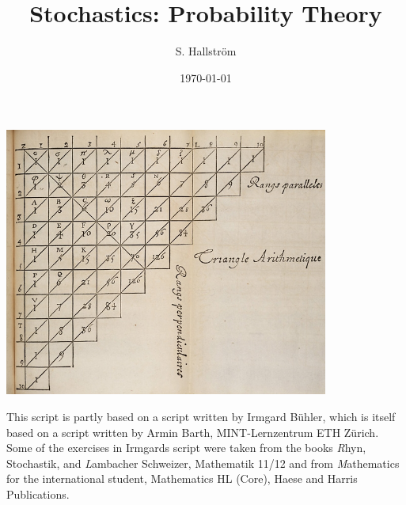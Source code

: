 \documentclass[twoside,11pt,a4paper]{article}
\newif\ifEN \ENtrue	                %
\def\tr|#1|#2|{\ifEN #2\else #1\fi}     %
\renewcommand{\footrulewidth}{0pt}
\theoremstyle{definition}
\begin{document}
\pagestyle{empty}
\ifEN{}\else\selectlanguage{ngerman}\fi
  \title{\Huge \tr|Stochastik: Wahrscheinlichkeit|Stochastics: Probability Theory|}
  \author{S. Hallström}
	
  \date{\large \today}
  \maketitle
\thispagestyle{empty}
\vspace{2cm}
\begin{center}
\includegraphics[width=0.8\textwidth]{TrianguloPascal.jpg}
\end{center}
\pagestyle{empty}




\newpage
\pagestyle{empty}
\tableofcontents
\vfill
\tr|Dieses Skript basiert teilweise auf einem Skript geschrieben von Irmgard Bühler, 
    welches wiederum auf einem Skript von Armin Barth (MINT-Lernzentrum ETH Zürich) 
    basiert. Einige der Aufgaben aus Irmgards Skript stammen aus den Büchern 
   \emph{Rhyn, Stochastik}, und \emph{Lambacher Schweizer, Mathematik 11/12} and from 
   \emph{Mathematics for the international student, Mathematics HL (Core), Haese and Harris Publications}.
   |This script is partly based on a script written by Irmgard Bühler, 
   which is itself based on a  script written by Armin Barth, 
   MINT-Lernzentrum ETH Zürich. Some of the exercises in Irmgards script were taken from the books 
   \emph{Rhyn, Stochastik}, and \emph{Lambacher Schweizer, Mathematik 11/12} and from 
   \emph{Mathematics for the international student, Mathematics HL (Core), Haese and Harris Publications}.|
\end{document}
